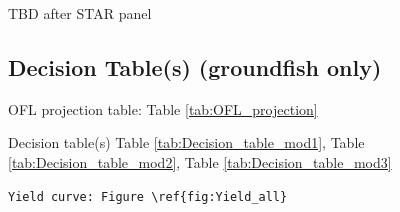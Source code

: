 \documentclass[12pt,]{article}
\begin{document}
TBD after STAR panel

\FloatBarrier

\subsection*{Decision Table(s) (groundfish
only)}\label{decision-tables-groundfish-only}

OFL projection table: Table \ref{tab:OFL_projection}

Decision table(s) Table \ref{tab:Decision_table_mod1}, Table
\ref{tab:Decision_table_mod2}, Table \ref{tab:Decision_table_mod3}

\begin{verbatim}
Yield curve: Figure \ref{fig:Yield_all}
\end{verbatim}
\end{document}
